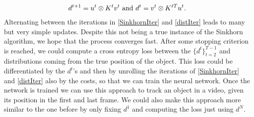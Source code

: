 \documentclass{article}
\begin{document}
\begin{align}\label{distIter}
d^{t+1} = u^t \otimes K^t v^t \textnormal{ and } d^t = v^t \otimes K^{tT} u^t.
\end{align}
Alternating between the iterations in \ref{SinkhornIter} and \ref{distIter} leads to many but very simple updates. Despite this not being a true instance of the Sinkhorn algorithm, we hope that the process converges fast. After some stopping criterion is reached, we could compute a cross entropy loss between the $\{d^t\}_{t=2}^{T-1}$ and distributions coming from the true position of the object. This loss could be differentiated by the $d^t$'s and then by unrolling the iterations of \ref{SinkhornIter} and \ref{distIter} also by the costs, so that we can train the neural network. Once the network is trained we can use this approach to track an object in a video, given its position in the first and last frame. We could also make this approach more similar to the one before by only fixing $d^1$ and computing the loss just using $d^N$.
\end{document}
